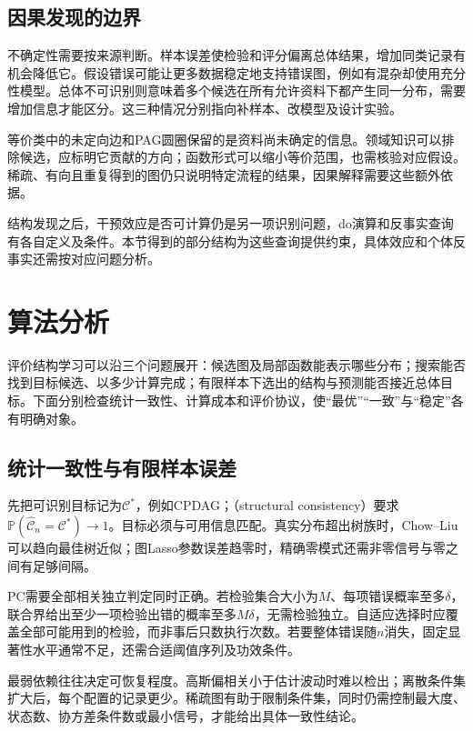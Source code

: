 \subsection{因果发现的边界}
\label{sec:pgm-structure-learning-causal-limits}

不确定性需要按来源判断。样本误差使检验和评分偏离总体结果，增加同类记录有机会降低它。假设错误可能让更多数据稳定地支持错误图，例如有混杂却使用充分性模型。总体不可识别则意味着多个候选在所有允许资料下都产生同一分布，需要增加信息才能区分。这三种情况分别指向补样本、改模型及设计实验。

等价类中的未定向边和PAG圆圈保留的是资料尚未确定的信息。领域知识可以排除候选，应标明它贡献的方向；函数形式可以缩小等价范围，也需核验对应假设。稀疏、有向且重复得到的图仍只说明特定流程的结果，因果解释需要这些额外依据。

结构发现之后，干预效应是否可计算仍是另一项识别问题，do演算和反事实查询有各自定义及条件。本节得到的部分结构为这些查询提供约束，具体效应和个体反事实还需按对应问题分析。

\section{算法分析}
\label{sec:pgm-structure-learning-analysis}

评价结构学习可以沿三个问题展开：候选图及局部函数能表示哪些分布；搜索能否找到目标候选、以多少计算完成；有限样本下选出的结构与预测能否接近总体目标。下面分别检查统计一致性、计算成本和评价协议，使“最优”“一致”与“稳定”各有明确对象。

\subsection{统计一致性与有限样本误差}
\label{sec:pgm-structure-learning-consistency}

先把可识别目标记为$\mathcal{C}^{*}$，例如CPDAG；（structural consistency）要求$\mathbb{P}(\widehat{\mathcal{C}}_n=\mathcal{C}^{*})\to1$。目标必须与可用信息匹配。真实分布超出树族时，Chow--Liu可以趋向最佳树近似；图Lasso参数误差趋零时，精确零模式还需非零信号与零之间有足够间隔。

PC需要全部相关独立判定同时正确。若检验集合大小为$M$、每项错误概率至多$\delta$，联合界给出至少一项检验出错的概率至多$M\delta$，无需检验独立。自适应选择时应覆盖全部可能用到的检验，而非事后只数执行次数。若要整体错误随$n$消失，固定显著性水平通常不足，还需合适阈值序列及功效条件。

最弱依赖往往决定可恢复程度。高斯偏相关小于估计波动时难以检出；离散条件集扩大后，每个配置的记录更少。稀疏图有助于限制条件集，同时仍需控制最大度、状态数、协方差条件数或最小信号，才能给出具体一致性结论。

